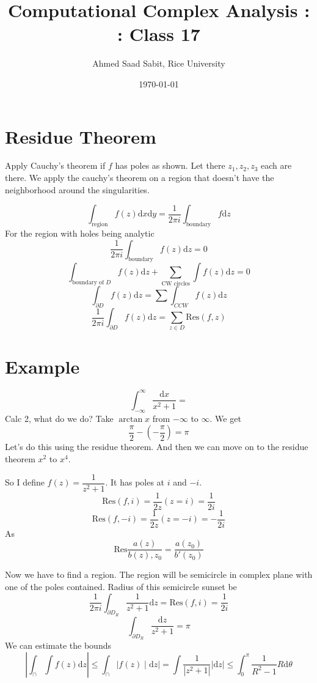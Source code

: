 \documentclass[letter]{article}
\title{Computational Complex Analysis : : Class 17}
\author{Ahmed Saad Sabit, Rice University}
\date{\today}
\renewcommand{\frac}{\dfrac}
\begin{document}
\maketitle

\section*{Residue Theorem} 
Apply Cauchy's theorem if $f$ has poles as shown. Let there $z_1, z_2, z_3$ each are there. We apply the cauchy's theorem on a region that doesn't have the neighborhood around the singularities. 

\[
	\int_{\text{region}} f(z) \mathrm{d} x \mathrm{d} y= \frac{1}{2\pi i } \int_{\text{boundary}} f \mathrm{d} z
\]
For the region with holes being analytic
\[
	\frac{1}{2\pi i} \int_{\text{boundary}} f(z)\mathrm{d} z  = 0
\] 
\[
	\int_{\text{boundary of } D} f(z)\mathrm{d} z + \sum_{\text{CW circles}} \int f(z)\mathrm{d} z = 0
\]
\[
	\int_{\partial D} f(z) \mathrm{d} z = \sum_{}^{} \int_{CCW} f(z)\mathrm{d} z
\]
\[
	\frac{1}{2 \pi i} \int_{\partial D} f(z)\mathrm{d} z = 
	\sum_{z \in  D}^{} \text{Res}(f,z)
\] 

\section*{Example} 
\[
	\int_{- \infty}^{\infty} \frac{\mathrm{d} x}{x^2 + 1} = 
\] Calc 2, what do we do? Take $\arctan x$ from $-\infty$ to $\infty$. We get
\[
\frac{\pi}{2} - \left(- \frac{\pi}{2}\right) =  \pi 
\] 
Let's do this using the residue theorem. And then we can move on to the residue theorem $x^2 $ to $x^{4}$. 

So I define $f(z) = \frac{1}{z^2 + 1}$. It has poles at $i$ and $-i$. 
\[
\text{Res}(f, i)= \frac{1}{2z} (z = i) = \frac{1}{2i}
\]
\[
\text{Res}(f, -i)= \frac{1}{2z} (z = -i) = -\frac{1}{2i}
\]
As 
\[
\text{Res} \frac{a(z)}{b(z), z_0} = \frac{a(z_0)}{b'(z_0)}
\]

Now we have to find a region.  The region will be semicircle in complex plane with one of the poles contained. Radius of this semicircle sunset be 
\[
	\frac{1}{2 \pi i } \int_{\partial D_R} \frac{1}{z^2 + 1}\mathrm{d} z = \text{Res}(f,i) = \frac{1}{2i}
\] 
\[
	\int_{\partial D_R} \frac{\mathrm{d} z}{z^2+1} = \pi 
\]
We can estimate the bounds
\[
| \int_{\cap } \int f(z) \mathrm{d} z | \le  \int_{\cap } |f(z) \mid \mathrm{d} z| = \int \frac{1}{|z^2+1|}|\mathrm{d} z | \le \int_0^{\pi } \frac{1}{R^2 - 1} R \mathrm{d} \theta
\] 
\end{document}
